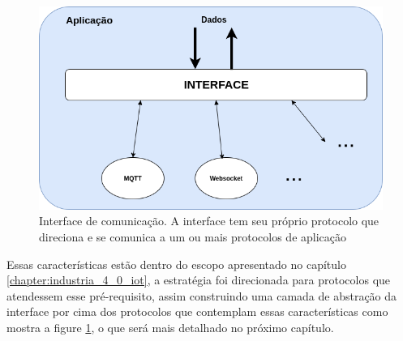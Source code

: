 \begin{figure}[h!]
\centering
\includegraphics[width=12cm]{./02_Capitulos/02_Cap2/figures/camada_abstracao}
\caption{Interface de comunicação. A interface tem seu próprio protocolo que direciona e se comunica a um ou mais protocolos de aplicação}
\label{fig:2.2.0/camada_abatracao}
\end{figure}

Essas características estão dentro do escopo apresentado no capítulo \ref{chapter:industria_4_0_iot}, a estratégia foi direcionada para protocolos que atendessem esse pré-requisito, assim construindo uma camada de abstração da interface por cima dos protocolos que contemplam essas características como mostra a figure \ref{fig:2.2.0/camada_abatracao}, o que será mais detalhado no próximo capítulo.


